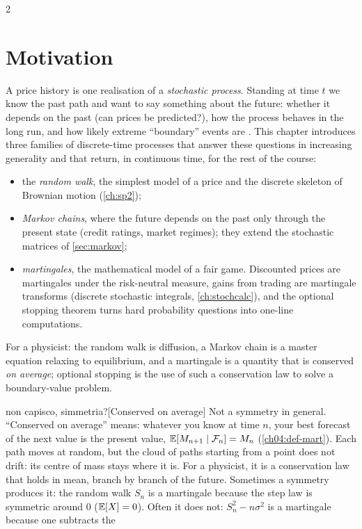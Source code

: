 \begin{paracol}{2}
\section*{Motivation}
A price history is one realisation of a \emph{stochastic process}. Standing at time $t$ we know the
past path and want to say something about the future: whether it depends on the past (can prices be
predicted?), how the process behaves in the long run, and how likely extreme ``boundary'' events are
. This chapter introduces three families of discrete-time processes that answer these
questions in increasing generality and that return, in continuous time, for the rest of the course:
\begin{itemize}
  \item the \emph{random walk}, the simplest model of a price and the discrete skeleton of Brownian
        motion (\cref{ch:sp2});
  \item \emph{Markov chains}, where the future depends on the past only through the present state
        (credit ratings, market regimes); they extend the stochastic matrices of \cref{sec:markov};
  \item \emph{martingales}, the mathematical model of a fair game. Discounted prices are martingales
        under the risk-neutral measure, gains from trading are martingale transforms (discrete
        stochastic integrals, \cref{ch:stochcalc}), and the optional stopping theorem turns
        hard probability questions into one-line computations.
\end{itemize}
For a physicist: the random walk is diffusion, a Markov chain is a master equation relaxing to
equilibrium, and a martingale is a quantity that is conserved \emph{on average}; optional stopping is the
use of such a conservation law to solve a boundary-value problem.
\begin{answer}{non capisco, simmetria?}[Conserved on average]
Not a symmetry in general. ``Conserved on average'' means: whatever you know at time $n$, your best
forecast of the next value is the present value, $\mathbb{E}[M_{n+1}\mid\mathcal F_n]=M_n$ (\cref{ch04:def-mart}).
Each path moves at random, but the cloud of paths starting from a point does not drift: its centre of
mass stays where it is. For a physicist, it is a conservation law that holds in mean, branch by branch of
the future.
Sometimes a symmetry produces it: the random walk $S_n$ is a martingale because the step law is symmetric
around $0$ ($\mathbb{E}[X]=0$). Often it does not: $S_n^2-n\sigma^2$ is a martingale because one subtracts the

\end{answer}
\end{paracol}
